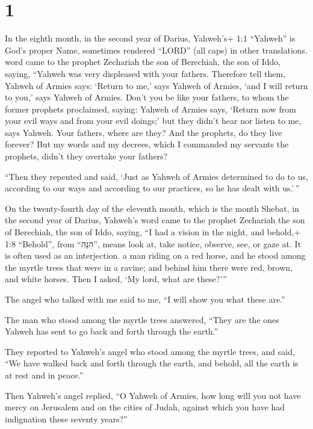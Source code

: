 \hypertarget{section}{%
\section{1}\label{section}}

 In the eighth month, in the second year of Darius,
Yahweh's+ 1:1 ``Yahweh'' is God's proper Name, sometimes rendered
``LORD'' (all caps) in other translations. word came to the prophet
Zechariah the son of Berechiah, the son of Iddo, saying, 
``Yahweh was very displeased with your fathers.  Therefore
tell them, Yahweh of Armies says: `Return to me,' says Yahweh of Armies,
`and I will return to you,' says Yahweh of Armies.  Don't
you be like your fathers, to whom the former prophets proclaimed,
saying: Yahweh of Armies says, `Return now from your evil ways and from
your evil doings;' but they didn't hear nor listen to me, says Yahweh.
 Your fathers, where are they? And the prophets, do they
live forever?  But my words and my decrees, which I
commanded my servants the prophets, didn't they overtake your fathers?

``Then they repented and said, `Just as Yahweh of Armies determined to
do to us, according to our ways and according to our practices, so he
has dealt with us.'\,''

 On the twenty-fourth day of the eleventh month, which is
the month Shebat, in the second year of Darius, Yahweh's word came to
the prophet Zechariah the son of Berechiah, the son of Iddo, saying,
 ``I had a vision in the night, and behold,+ 1:8 ``Behold'',
from ``הִנֵּה'', means look at, take notice, observe, see, or gaze at.
It is often used as an interjection. a man riding on a red horse, and he
stood among the myrtle trees that were in a ravine; and behind him there
were red, brown, and white horses.  Then I asked, `My lord,
what are these?'''

The angel who talked with me said to me, ``I will show you what these
are.''

 The man who stood among the myrtle trees answered, ``They
are the ones Yahweh has sent to go back and forth through the earth.''

 They reported to Yahweh's angel who stood among the myrtle
trees, and said, ``We have walked back and forth through the earth, and
behold, all the earth is at rest and in peace.''

 Then Yahweh's angel replied, ``O Yahweh of Armies, how
long will you not have mercy on Jerusalem and on the cities of Judah,
against which you have had indignation these seventy years?''

